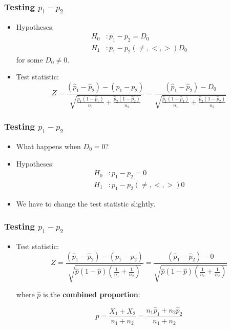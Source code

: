 \documentclass[12pt]{beamer}
\begin{document}
	\begin{frame}
		\frametitle{Testing $p_1 - p_2$}
		
		\begin{itemize}[label={\color{blue}$\blacktriangleright$}]
			\item Hypotheses:
			\[
			\begin{aligned}
				H_0 &: p_1 - p_2 = D_0 \\
				H_1 &: p_1 - p_2 (\neq, <, >) D_0
			\end{aligned}
			\]
			for some $D_0 \neq 0$.
			
			\item Test statistic:
			\[
			Z = \frac{(\hat{p}_1 - \hat{p}_2) - (p_1 - p_2)}{\sqrt{\frac{\hat{p}_1(1-\hat{p}_1)}{n_1} + \frac{\hat{p}_2(1-\hat{p}_2)}{n_2}}} = \frac{(\hat{p}_1 - \hat{p}_2) - D_0}{\sqrt{\frac{\hat{p}_1(1-\hat{p}_1)}{n_1} + \frac{\hat{p}_2(1-\hat{p}_2)}{n_2}}}
			\]
		\end{itemize}
		
	\end{frame}
	\begin{frame}
		\frametitle{Testing $p_1 - p_2$}
		
		\begin{itemize}[label={\color{blue}$\blacktriangleright$}]
			\item What happens when $D_0 = 0$?
			
			\item Hypotheses:
			\[
			\begin{aligned}
				H_0 &: p_1 - p_2 = 0 \\
				H_1 &: p_1 - p_2 (\neq, <, >) 0
			\end{aligned}
			\]
			
			\item We have to change the test statistic slightly.
		\end{itemize}
		
	\end{frame}
	\begin{frame}
		\frametitle{Testing $p_1 - p_2$}
		
		\begin{itemize}[label={\color{blue}$\blacktriangleright$}]
			\item Test statistic:
			\[
			Z = \frac{(\hat{p}_1 - \hat{p}_2) - (p_1 - p_2)}{\sqrt{\hat{p}(1 - \hat{p})\left(\frac{1}{n_1} + \frac{1}{n_2}\right)}} = \frac{(\hat{p}_1 - \hat{p}_2) - 0}{\sqrt{\hat{p}(1 - \hat{p})\left(\frac{1}{n_1} + \frac{1}{n_2}\right)}}
			\]
			
			where $\hat{p}$ is the \textbf{combined proportion}:
			
			\[
			\hat{p} = \frac{X_1 + X_2}{n_1 + n_2} = \frac{n_1\hat{p}_1 + n_2\hat{p}_2}{n_1 + n_2}
			\]
		\end{itemize}
		
	\end{frame}
\end{document}
